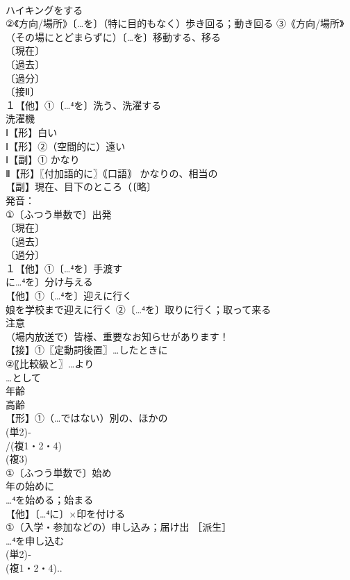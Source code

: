 \documentclass[8pt]{extreport}
\begin{document}
\begin{CJK}{UTF8}{min}
\\	ハイキングをする 
\\	②《方向/場所》〔…を〕（特に目的もなく）歩き回る；動き回る ③《方向/場所》（その場にとどまらずに）〔…を〕移動する、移る
\\	〔現在〕
\\	〔過去〕
\\	〔過分〕
\\	〔接Ⅱ〕
\\	１【他】①〔…⁴を〕洗う、洗濯する 
\\	洗濯機
\\	Ⅰ【形】白い 
\\	Ⅰ【形】②（空間的に）遠い
\\	Ⅰ【副】① かなり 
\\	Ⅱ【形】〖付加語的に〗｟口語｠ かなりの、相当の
\\	【副】現在、目下のところ（〔略〕
\\	発音：
\\	①〔ふつう単数で〕出発 
\\	〔現在〕
\\	〔過去〕
\\	〔過分〕
\\	１【他】①〔…⁴を〕手渡す 
\\	に…⁴を〕分け与える
\\	【他】①〔…⁴を〕迎えに行く 
\\	娘を学校まで迎えに行く ②〔…⁴を〕取りに行く；取って来る
\\	注意 
\\	（場内放送で）皆様、重要なお知らせがあります！
\\	【接】①〖定動詞後置〗…したときに 
\\	②〖比較級と〗…より　
\\	…として
\\	年齢 
\\	高齢
\\	【形】①（…ではない）別の、ほかの 
\\	(単2)‐
\\	/(複1・2・4)
\\	(複3)
\\	①〔ふつう単数で〕始め 
\\	年の始めに 
\\	…⁴を始める；始まる
\\	【他】〔…⁴に〕×印を付ける 
\\	①（入学・参加などの）申し込み；届け出 ［派生］ 
\\	…⁴を申し込む
\\	(単2)‐
\\	(複1・2・4)..

\end{CJK}
\end{document}
